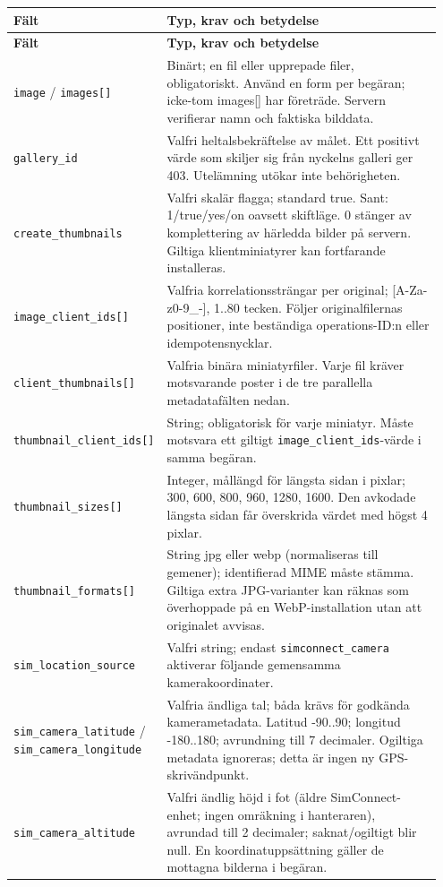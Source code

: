 \documentclass[11pt,a4paper]{article}
\newcommand{\codeword}[1]{\nolinkurl{#1}}
\begin{document}
\begin{longtable}{@{}>{\RaggedRight\arraybackslash}p{0.28\linewidth}>{\RaggedRight\arraybackslash}p{0.67\linewidth}@{}}
\toprule
\textbf{Fält} & \textbf{Typ, krav och betydelse} \\
\midrule
\endfirsthead
\toprule
\textbf{Fält} & \textbf{Typ, krav och betydelse} \\
\midrule
\endhead
\bottomrule
\endfoot
\codeword{image} / \codeword{images[]} & Binärt; en fil eller upprepade filer,
obligatoriskt. Använd en form per begäran; icke-tom images[] har företräde. Servern
verifierar namn och faktiska bilddata. \\
\codeword{gallery_id} & Valfri heltalsbekräftelse av målet. Ett positivt värde som skiljer
sig från nyckelns galleri ger 403. Utelämning utökar inte behörigheten. \\
\codeword{create_thumbnails} & Valfri skalär flagga; standard true. Sant: 1/true/yes/on
oavsett skiftläge. 0 stänger av komplettering av härledda bilder på servern. Giltiga
klientminiatyrer kan fortfarande installeras. \\
\codeword{image_client_ids[]} & Valfria korrelationssträngar per original; [A-Za-z0-9\_-],
1..80 tecken. Följer originalfilernas positioner, inte beständiga operations-ID:n eller
idempotensnycklar. \\
\codeword{client_thumbnails[]} & Valfria binära miniatyrfiler. Varje fil kräver motsvarande
poster i de tre parallella metadatafälten nedan. \\
\codeword{thumbnail_client_ids[]} & String; obligatorisk för varje miniatyr. Måste motsvara
ett giltigt \codeword{image_client_ids}-värde i samma begäran. \\
\codeword{thumbnail_sizes[]} & Integer, mållängd för längsta sidan i pixlar; 300, 600, 800,
960, 1280, 1600. Den avkodade längsta sidan får överskrida värdet med högst 4 pixlar. \\
\codeword{thumbnail_formats[]} & String jpg eller webp (normaliseras till gemener);
identifierad MIME måste stämma. Giltiga extra JPG-varianter kan räknas som överhoppade på en
WebP-installation utan att originalet avvisas. \\
\codeword{sim_location_source} & Valfri string; endast \codeword{simconnect_camera}
aktiverar följande gemensamma kamerakoordinater. \\
\codeword{sim_camera_latitude} / \codeword{sim_camera_longitude} & Valfria ändliga tal; båda
krävs för godkända kamerametadata. Latitud -90..90; longitud -180..180; avrundning till 7
decimaler. Ogiltiga metadata ignoreras; detta är ingen ny GPS-skrivändpunkt. \\
\codeword{sim_camera_altitude} & Valfri ändlig höjd i fot (äldre SimConnect-enhet; ingen
omräkning i hanteraren), avrundad till 2 decimaler; saknat/ogiltigt blir null. En
koordinatuppsättning gäller de mottagna bilderna i begäran. \\
\end{longtable}
\end{document}
